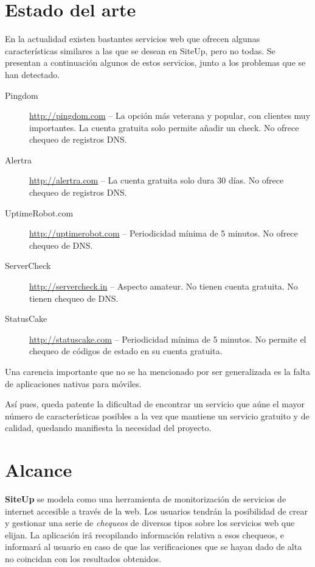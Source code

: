 \section{Estado del arte}

En la actualidad existen bastantes servicios web que ofrecen algunas
características similares a las que se desean en SiteUp, pero no todas. Se
presentan a continuación algunos de estos servicios, junto a los problemas que
se han detectado.

\begin{description}
\item[Pingdom] \url{http://pingdom.com} -- La opción más veterana y popular, con
  clientes muy importantes. La cuenta gratuita solo permite añadir un check. No
  ofrece chequeo de registros DNS.
\item[Alertra] \url{http://alertra.com} -- La cuenta gratuita solo dura 30
  días. No ofrece chequeo de registros DNS.
\item[UptimeRobot.com] \url{http://uptimerobot.com} -- Periodicidad mínima de 5
  minutos. No ofrece chequeo de DNS.
\item[ServerCheck] \url{http://servercheck.in} -- Aspecto amateur. No tienen
  cuenta gratuita. No tienen chequeo de DNS.
\item[StatusCake] \url{http://statuscake.com} -- Periodicidad mínima de 5
  minutos. No permite el chequeo de códigos de estado en su cuenta gratuita.

\end{description}

Una carencia importante que no se ha mencionado por ser generalizada es la falta
de aplicaciones nativas para móviles. 

Así pues, queda patente la dificultad de encontrar un servicio que aúne el mayor
número de características posibles a la vez que mantiene un servicio gratuito y
de calidad, quedando manifiesta la necesidad del proyecto.


\section{Alcance}
\textbf{SiteUp} se modela como una herramienta de monitorización de servicios de
internet accesible a través de la web. Los usuarios tendrán la posibilidad de
crear y gestionar una serie de \textit{chequeos} de diversos tipos sobre los
servicios web que elijan. La aplicación irá recopilando información relativa a
esos chequeos, e informará al usuario en caso de que las verificaciones que se
hayan dado de alta no coincidan con los resultados obtenidos.

